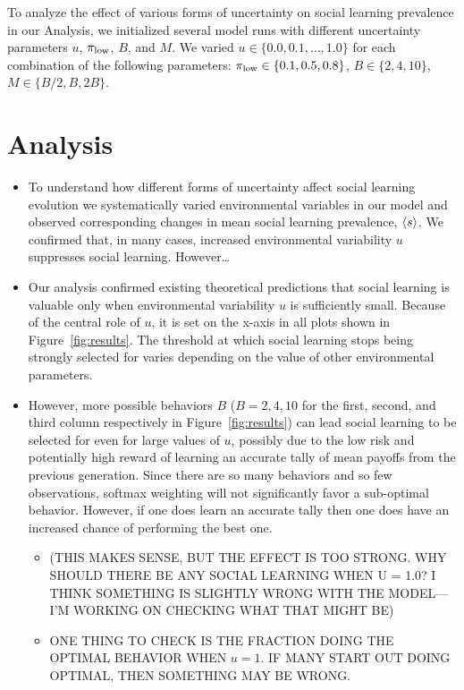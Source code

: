 \documentclass[letterpaper,11.5pt]{scrartcl}
\begin{document}
To analyze the effect of various forms of uncertainty on social learning 
prevalence in our Analysis, we initialized several model runs with
different uncertainty parameters $u$, $\pi_{\mathrm{\mathrm{low}}}$, $B$,
and $M$. We varied $u \in \{0.0, 0.1, \ldots, 1.0\}$ for each combination of
the following parameters:
$\pi_{\mathrm{low}} \in \{0.1, 0.5, 0.8\}$, $B \in \{2, 4, 10\}$, $M \in \{B/2, B, 2B\}$.



\section{Analysis}

\begin{itemize}
  \item 
    To understand how different forms of uncertainty affect social learning evolution
    we systematically varied environmental variables in our model and observed
    corresponding changes in mean social learning prevalence, $\langle s \rangle$. We
    confirmed that, in many cases, increased environmental variability $u$ 
    suppresses social learning. However\ldots 


  \item 
    Our analysis confirmed existing theoretical predictions that social learning
    is valuable only when environmental variability $u$ is sufficiently small.
    Because of the central role of $u$, it is set on the x-axis in
    all plots shown in Figure~\ref{fig:results}. 
    The threshold at which social learning stops being strongly selected for
    varies depending on the value of other environmental parameters. 

  \item 
    However, more possible behaviors $B$ ($B=2,4,10$ for the first, second, and
    third column respectively in Figure~\ref{fig:results}) can lead
    social learning to be selected for even for large values of $u$, possibly
    due to the low risk and potentially high reward of learning an accurate
    tally of mean payoffs from the previous generation. 
    Since there are so many behaviors and so
    few observations, softmax weighting will not significantly 
    favor a sub-optimal behavior. However, if one does learn an accurate tally
    then one does have an increased chance of performing the best one.
    \begin{itemize}
      \item 
        (THIS MAKES SENSE, BUT THE EFFECT IS TOO STRONG. WHY SHOULD THERE BE ANY
        SOCIAL LEARNING WHEN U = 1.0?  I THINK SOMETHING IS SLIGHTLY WRONG WITH THE
        MODEL---I'M WORKING ON CHECKING WHAT THAT MIGHT BE)
      \item
        ONE THING TO CHECK IS THE FRACTION DOING THE OPTIMAL BEHAVIOR WHEN
        $u=1$. IF MANY START OUT DOING OPTIMAL, THEN SOMETHING MAY BE WRONG.
    \end{itemize}


\end{itemize}
\end{document}
